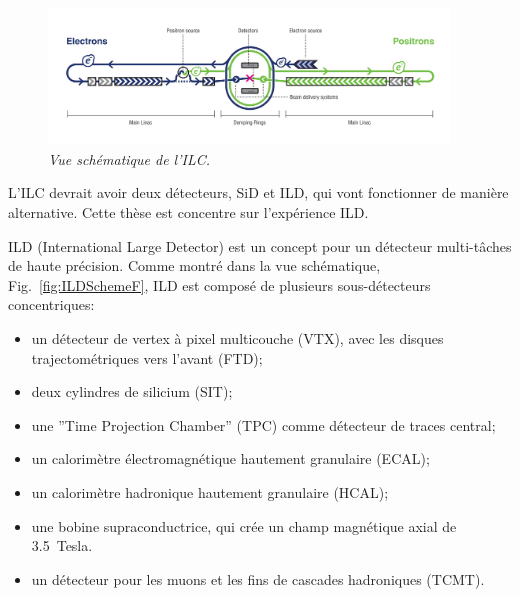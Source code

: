 \begin{figure}
	{\centering
		\includegraphics[width=0.95\textwidth]{graphics/ILC_scheme.jpg}
		\caption{\sl Vue sch\'ematique de l'ILC.}
		\label{fig:ILCSchemeF}
	}
\end{figure}

L’ILC devrait avoir deux d\'etecteurs, SiD et ILD, qui vont fonctionner de mani\`ere alternative.
Cette thèse est concentre sur l'expérience ILD. 

ILD (International Large Detector) est un concept pour un détecteur multi-tâches de haute précision. %
Comme montr\'e dans la vue schématique, Fig.~\ref {fig:ILDSchemeF}, ILD est compos\'e de plusieurs sous-d\'etecteurs concentriques:
\begin{itemize}
	\item un d\'etecteur de vertex à pixel multicouche (VTX), avec les disques trajectométriques vers l'avant (FTD);
	\item deux cylindres de silicium (SIT);
	\item une ”Time Projection Chamber” (TPC) comme d\'etecteur de traces central;
	\item un calorim\`etre \'electromagn\'etique hautement granulaire (ECAL);
	\item un calorim\`etre hadronique hautement granulaire (HCAL);
	\item une bobine supraconductrice, qui cr\'ee un champ magn\'etique axial de 3.5~Tesla.
	\item un d\'etecteur pour les muons et les fins de cascades hadroniques (TCMT).
\end{itemize}

